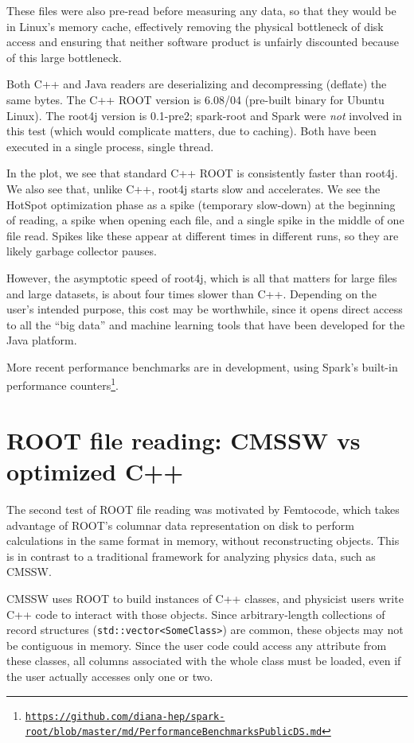 \documentclass[12pt]{article}
\begin{document}
These files were also pre-read before measuring any data, so that they would be in Linux's memory cache, effectively removing the physical bottleneck of disk access and ensuring that neither software product is unfairly discounted because of this large bottleneck.

Both C++ and Java readers are deserializing and decompressing (deflate) the same bytes. The C++ ROOT version is 6.08/04 (pre-built binary for Ubuntu Linux). The root4j version is 0.1-pre2; spark-root and Spark were {\it not} involved in this test (which would complicate matters, due to caching). Both have been executed in a single process, single thread.

In the plot, we see that standard C++ ROOT is consistently faster than root4j. We also see that, unlike C++, root4j starts slow and accelerates. We see the HotSpot optimization phase as a spike (temporary slow-down) at the beginning of reading, a spike when opening each file, and a single spike in the middle of one file read. Spikes like these appear at different times in different runs, so they are likely garbage collector pauses.

However, the asymptotic speed of root4j, which is all that matters for large files and large datasets, is about four times slower than C++. Depending on the user's intended purpose, this cost may be worthwhile, since it opens direct access to all the ``big data'' and machine learning tools that have been developed for the Java platform.

More recent performance benchmarks are in development, using Spark's built-in performance counters\footnote{\href{https://github.com/diana-hep/spark-root/blob/master/md/PerformanceBenchmarksPublicDS.md}{\tt https://github.com/diana-hep/spark-root/blob/master/md/PerformanceBenchmarksPublicDS.md}}.

\section*{ROOT file reading: CMSSW vs optimized C++}

The second test of ROOT file reading was motivated by Femtocode, which takes advantage of ROOT's columnar data representation on disk to perform calculations in the same format in memory, without reconstructing objects. This is in contrast to a traditional framework for analyzing physics data, such as CMSSW.

CMSSW uses ROOT to build instances of C++ classes, and physicist users write C++ code to interact with those objects. Since arbitrary-length collections of record structures ({\tt std::vector<SomeClass>}) are common, these objects may not be contiguous in memory. Since the user code could access any attribute from these classes, all columns associated with the whole class must be loaded, even if the user actually accesses only one or two.
\end{document}
